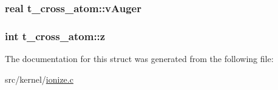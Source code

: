 \hypertarget{structt__cross__atom_a6617776a5a4f0b581aef65c89cd594ab}{
\subsubsection[{v\-Auger}]{\setlength{\rightskip}{0pt plus 5cm}real {\bf t\-\_\-cross\-\_\-atom\-::v\-Auger}}}\label{structt__cross__atom_a6617776a5a4f0b581aef65c89cd594ab}
\hypertarget{structt__cross__atom_a3e2bc01913e66a2a0ec143b40ff1e221}{
\subsubsection[{z}]{\setlength{\rightskip}{0pt plus 5cm}int {\bf t\-\_\-cross\-\_\-atom\-::z}}}\label{structt__cross__atom_a3e2bc01913e66a2a0ec143b40ff1e221}


\-The documentation for this struct was generated from the following file\-:\begin{DoxyCompactItemize}
\item 
src/kernel/\hyperlink{ionize_8c}{ionize.\-c}\end{DoxyCompactItemize}
